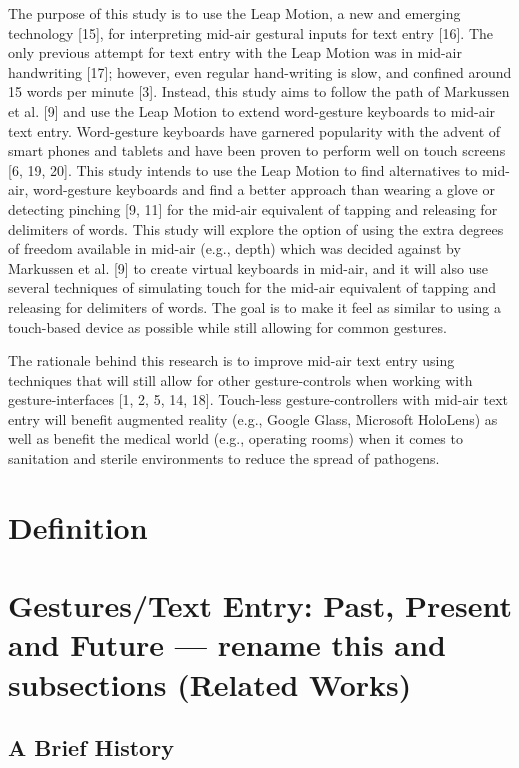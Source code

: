 The purpose of this study is to use the Leap Motion, a new and emerging technology [15], for interpreting mid-air gestural inputs for text entry [16]. The only previous attempt for text entry with the Leap Motion was in mid-air handwriting [17]; however, even regular hand-writing is slow, and confined around 15 words per minute [3]. Instead, this study aims to follow the path of Markussen et al. [9] and use the Leap Motion to extend word-gesture keyboards to mid-air text entry. Word-gesture keyboards have garnered popularity with the advent of smart phones and tablets and have been proven to perform well on touch screens [6, 19, 20]. This study intends to use the Leap Motion to find alternatives to mid-air, word-gesture keyboards and find a better approach than wearing a glove or detecting pinching [9, 11] for the mid-air equivalent of tapping and releasing for delimiters of words. This study will explore the option of using the extra degrees of freedom available in mid-air (e.g., depth) which was decided against by Markussen et al. [9] to create virtual keyboards in mid-air, and it will also use several techniques of simulating touch for the mid-air equivalent of tapping and releasing for delimiters of words. The goal is to make it feel as similar to using a touch-based device as possible while still allowing for common gestures.

The rationale behind this research is to improve mid-air text entry using techniques that will still allow for other gesture-controls when working with gesture-interfaces [1, 2, 5, 14, 18]. Touch-less gesture-controllers with mid-air text entry will benefit augmented reality (e.g., Google Glass, Microsoft HoloLens) as well as benefit the medical world (e.g., operating rooms) when it comes to sanitation and sterile environments to reduce the spread of pathogens.

\section{Definition}

\section{Gestures/Text Entry: Past, Present and Future --- rename this and subsections (Related Works)}

\subsection{A Brief History}


